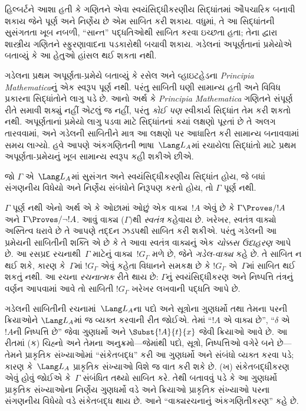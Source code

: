 \begingroup
\makeatletter{}\makeatother


\label{guunit:OLP-0278}


હિલ્બર્ટને આશા હતી કે ગણિતને એવા
સ્વયંસિદ્ધીકરણીય સિદ્ધાંતમાં ઔપચારિક બનાવી
શકાય જેને પૂર્ણ અને નિર્ણેય
છે એમ સાબિત કરી શકાય. વધુમાં, તે આ
સિદ્ધાંતની સુસંગતતા ખૂબ નબળી, ``સાન્ત''
પદ્ધતિઓથી સાબિત કરવા ઇચ્છતા હતા;
તેના દ્વારા શાસ્ત્રીય ગણિતને સ્ફુરણાવાદના
પડકારોથી બચાવી શકાય. ગડેલનાં અપૂર્ણતાનાં
પ્રમેયોએ બતાવ્યું કે આ હેતુઓ હાંસલ થઈ
શકતા નથી.

ગડેલના પ્રથમ અપૂર્ણતા-પ્રમેયે બતાવ્યું કે
રસેલ અને વ્હાઇટહેડના \emph{Principia
Mathematica}નું એક સ્વરૂપ પૂર્ણ
નથી. પરંતુ સાબિતી ઘણી સામાન્ય હતી અને
વિવિધ પ્રકારના સિદ્ધાંતોને લાગુ પડે છે. આનો
અર્થ કે \emph{Principia Mathematica}
ગણિતને સંપૂર્ણ રીતે સમાવી શક્યું નહીં એટલું
જ નહીં, પરંતુ \emph{કોઈ પણ} સ્વીકાર્ય
સિદ્ધાંત તેમ કરી શકતો નથી. અપૂર્ણતાનાં
પ્રમેયો લાગુ પડવા માટે સિદ્ધાંતનાં કયાં
લક્ષણો પૂરતાં છે તે અલગ તારવવામાં, અને
ગડેલની સાબિતીને માત્ર આ લક્ષણો પર આધારિત
કરી સામાન્ય બનાવવામાં સમય લાગ્યો.
હવે આપણે અંકગણિતની ભાષા~$\Lang L_A$માં
રચાયેલા સિદ્ધાંતો માટે પ્રથમ અપૂર્ણતા-પ્રમેયનું
ખૂબ સામાન્ય સ્વરૂપ કહી શકીએ છીએ.

\begin{thm}
જો $\Gamma$ એ~$\Lang L_A$માં સુસંગત
અને સ્વયંસિદ્ધીકરણીય સિદ્ધાંત હોય, જે બધાં
સંગણનીય વિધેયો અને નિર્ણેય સંબંધોને
નિરૂપણ કરતો હોય, તો $\Gamma$
પૂર્ણ નથી.
\end{thm}

$\Gamma$ પૂર્ણ નથી એનો અર્થ એ
કે ઓછામાં ઓછું એક વાક્ય~$!A$ એવું
છે કે $\Gamma \Proves/ !A$ અને
$\Gamma \Proves/ \lnot !A$. આવું
વાક્ય ($\Gamma)$થી \emph{સ્વતંત્ર}
કહેવાય છે. ખરેખર, સ્વતંત્ર વાક્યો અસ્તિત્વ
ધરાવે છે તે આપણે તદ્દન ઝડપથી સાબિત કરી
શકીએ. પરંતુ ગડેલની આ પ્રમેયની સાબિતીની
શક્તિ એ છે કે તે આવા સ્વતંત્ર વાક્યનું
એક \emph{ચોક્કસ ઉદાહરણ} આપે છે. આ
રસપ્રદ રચનાથી~$\Gamma$ માટેનું
વાક્ય~$!G_\Gamma$ મળે છે, જેને
\emph{ગડેલ-વાક્ય} કહે છે. તે સાબિત ન થઈ
શકે, કારણ કે~$\Gamma$માં $!G_\Gamma$
એવું કહેતા વિધાનને સમકક્ષ છે કે
$!G_\Gamma$ એ~$\Gamma$માં સાબિત
થઈ શકતું નથી. આ રચના \emph{રચનાત્મક}
રીતે થાય છે: $\Gamma$નું સ્વયંસિદ્ધીકરણ
અને નિષ્પત્તિ તંત્રનું વર્ણન આપવામાં
આવે તો સાબિતી $!G_\Gamma$ ખરેખર લખવાની
પદ્ધતિ આપે છે.

ગડેલની સાબિતીની રચનામાં~$\Lang L_A$ના
પદો અને સૂત્રોના ગુણધર્મો તથા તેમના
પરની ક્રિયાઓને $\Lang L_A$માં જ વ્યક્ત કરવાની
રીત જોઈએ. તેમાં ``$!A$ એ વાક્ય
છે'', ``$\delta$ એ~$!A$ની
નિષ્પત્તિ છે'' જેવા ગુણધર્મો અને
$\Subst{!A}{t}{x}$ જેવી ક્રિયાઓ આવે છે.
આ રીતમાં (ક) ચિહ્નો અને તેમના અનુક્રમો—જેમાંથી
પદો, સૂત્રો, નિષ્પત્તિઓ વગેરે
બને છે—તેમને પ્રાકૃતિક સંખ્યાઓમાં ``સંકેતબદ્ધ''
કરી આ ગુણધર્મો અને સંબંધો વ્યક્ત કરવા પડે;
કારણ કે~$\Lang L_A$ પ્રાકૃતિક સંખ્યાઓ
વિશે જ વાત કરી શકે છે. (ખ) સંકેતબદ્ધીકરણ
એવું હોવું જોઈએ કે~$\Gamma$ સંબંધિત તથ્યો
સાબિત કરે. તેથી બતાવવું પડે કે આ ગુણધર્મો
પ્રાકૃતિક સંખ્યાઓના નિર્ણેય ગુણધર્મો
વડે અને ક્રિયાઓ પ્રાકૃતિક સંખ્યાઓ પરના
સંગણનીય વિધેયો વડે સંકેતબદ્ધ થાય છે.
આને ``વાક્યરચનાનું અંકગણિતીકરણ'' કહે છે.

